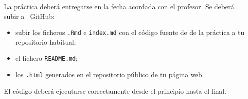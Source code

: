 \documentclass[11pt,a4paper]{article}
\newcommand{\GitHub}{\faIcon{github}~\!GitHub}
\theoremstyle{exercise}
\begin{document}
La práctica deberá entregarse en la fecha acordada con el profesor. Se deberá subir a \GitHub:
\begin{itemize}
\item subir los ficheros \texttt{.Rmd} e \texttt{index.md} con el código fuente de  de la práctica a tu repositorio habitual;
\item el fichero \texttt{README.md};
\item los \texttt{.html} generados en el repositorio público de tu página web.
\end{itemize}
El código deberá ejecutarse correctamente desde el principio hasta el final.
\end{document}
